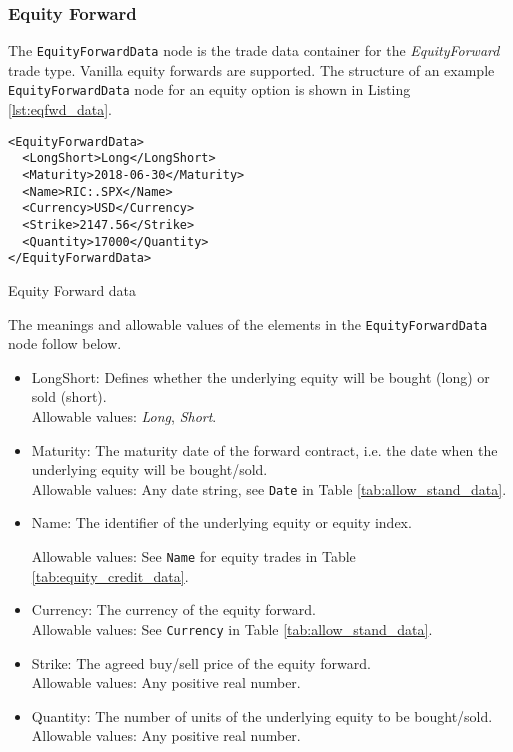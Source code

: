 \subsubsection{Equity Forward}

The \lstinline!EquityForwardData!  node is the trade data container for the \emph{EquityForward} trade type.  Vanilla equity 
forwards are supported. The structure of an example \lstinline!EquityForwardData! node for an equity option is shown in 
Listing \ref{lst:eqfwd_data}.

\begin{listing}[H]
\begin{verbatim}
<EquityForwardData>
  <LongShort>Long</LongShort>
  <Maturity>2018-06-30</Maturity>
  <Name>RIC:.SPX</Name>
  <Currency>USD</Currency>
  <Strike>2147.56</Strike>
  <Quantity>17000</Quantity>
</EquityForwardData>
\end{verbatim}
\caption{Equity Forward data}
\label{lst:eqfwd_data}
\end{listing}

The meanings and allowable values of the elements in the \lstinline!EquityForwardData!  node follow below.

\begin{itemize}
	\item LongShort: Defines whether the underlying equity will be bought (long) or sold (short). \\
	Allowable values:  \emph{Long}, \emph{Short}.
	\item Maturity: The maturity date of the forward contract, i.e. the date when the underlying equity will be bought/sold. \\
	Allowable values: Any date string, see \lstinline!Date! in Table \ref{tab:allow_stand_data}.
	\item Name: The identifier of the underlying equity or equity index. 
	
	Allowable values:  See \lstinline!Name! for equity trades in Table \ref{tab:equity_credit_data}. \\
	\item Currency: The  currency of the equity forward. \\
	Allowable values:  See \lstinline!Currency! in Table \ref{tab:allow_stand_data}.	
	\item Strike: The agreed buy/sell price of the equity forward. \\
	Allowable values:  Any positive real number.	
	\item Quantity: The number of units of the underlying equity to be bought/sold. \\
	Allowable values:  Any positive real number.
\end{itemize}